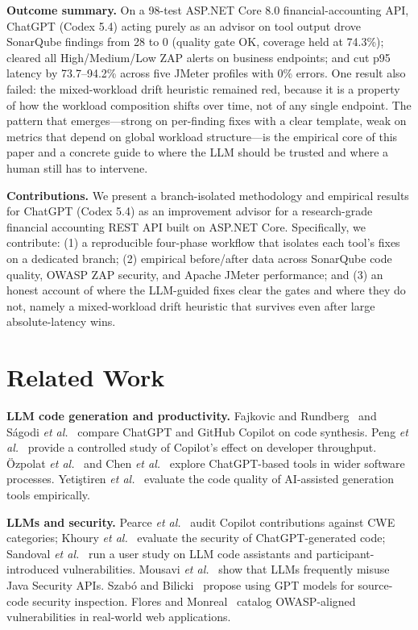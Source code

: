 \documentclass[conference]{IEEEtran}
\begin{document}
\textbf{Outcome summary.} On a 98-test ASP.NET Core 8.0 financial-accounting API, ChatGPT (Codex 5.4) acting purely as an advisor on tool output drove SonarQube findings from 28 to 0 (quality gate OK, coverage held at 74.3\%); cleared all High/Medium/Low ZAP alerts on business endpoints; and cut p95 latency by 73.7--94.2\% across five JMeter profiles with 0\% errors. One result also failed: the mixed-workload drift heuristic remained red, because it is a property of how the workload composition shifts over time, not of any single endpoint. The pattern that emerges---strong on per-finding fixes with a clear template, weak on metrics that depend on global workload structure---is the empirical core of this paper and a concrete guide to where the LLM should be trusted and where a human still has to intervene.

\textbf{Contributions.} We present a branch-isolated methodology and empirical results for ChatGPT (Codex 5.4) as an improvement advisor for a research-grade financial accounting REST API built on ASP.NET Core. Specifically, we contribute: (1) a reproducible four-phase workflow that isolates each tool's fixes on a dedicated branch; (2) empirical before/after data across SonarQube code quality, OWASP ZAP security, and Apache JMeter performance; and (3) an honest account of where the LLM-guided fixes clear the gates and where they do not, namely a mixed-workload drift heuristic that survives even after large absolute-latency wins.

\section{Related Work}
\textbf{LLM code generation and productivity.} Fajkovic and Rundberg~\cite{ref1} and S\'agodi \textit{et al.}~\cite{ref2} compare ChatGPT and GitHub Copilot on code synthesis. Peng \textit{et al.}~\cite{ref10} provide a controlled study of Copilot's effect on developer throughput. \"Ozpolat \textit{et al.}~\cite{ref3} and Chen \textit{et al.}~\cite{ref4} explore ChatGPT-based tools in wider software processes. Yeti\c stiren \textit{et al.}~\cite{ref8} evaluate the code quality of AI-assisted generation tools empirically.

\textbf{LLMs and security.} Pearce \textit{et al.}~\cite{ref11} audit Copilot contributions against CWE categories; Khoury \textit{et al.}~\cite{ref12} evaluate the security of ChatGPT-generated code; Sandoval \textit{et al.}~\cite{ref13} run a user study on LLM code assistants and participant-introduced vulnerabilities. Mousavi \textit{et al.}~\cite{ref6} show that LLMs frequently misuse Java Security APIs. Szab\'o and Bilicki~\cite{ref7} propose using GPT models for source-code security inspection. Flores and Monreal~\cite{ref9} catalog OWASP-aligned vulnerabilities in real-world web applications.
\end{document}
